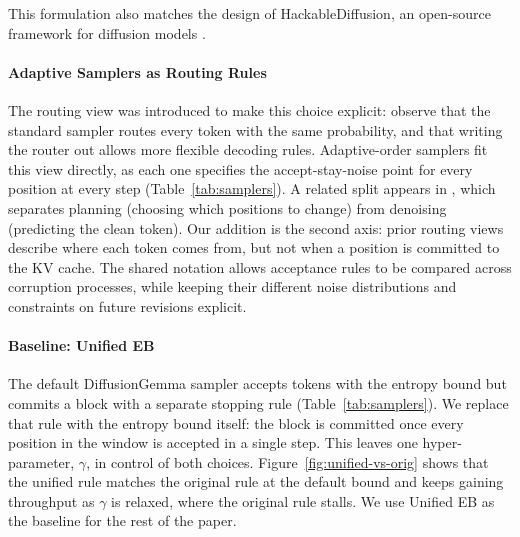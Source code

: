 This formulation also matches the design of HackableDiffusion, an open-source framework for diffusion models \citep{hackable_diffusion2026github}.

\paragraph{Adaptive Samplers as Routing Rules}
The routing view was introduced to make this choice explicit: \citet{zheng2023reparameterized} observe that the standard sampler routes every token with the same probability, and that writing the router out allows more flexible decoding rules.
Adaptive-order samplers fit this view directly, as each one specifies the accept-stay-noise point for every position at every step (Table~\ref{tab:samplers}).
A related split appears in \citet{liu2025think}, which separates planning (choosing which positions to change) from denoising (predicting the clean token).
Our addition is the second axis: prior routing views describe where each token comes from, but not when a position is committed to the KV cache.
The shared notation allows acceptance rules to be compared across corruption processes, while keeping their different noise distributions and constraints on future revisions explicit.

\paragraph{Baseline: Unified EB}
The default DiffusionGemma sampler accepts tokens with the entropy bound but commits a block with a separate stopping rule (Table~\ref{tab:samplers}).
We replace that rule with the entropy bound itself: the block is committed once every position in the window is accepted in a single step.
This leaves one hyper-parameter, $\gamma$, in control of both choices.
Figure~\ref{fig:unified-vs-orig} shows that the unified rule matches the original rule at the default bound and keeps gaining throughput as $\gamma$ is relaxed, where the original rule stalls.
We use Unified EB as the baseline for the rest of the paper.

